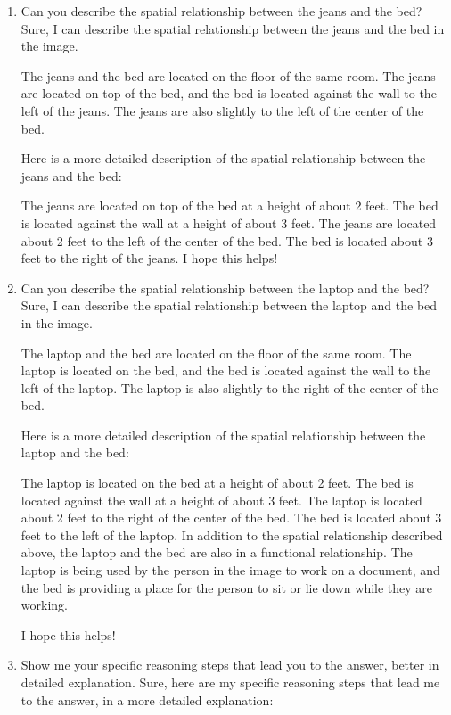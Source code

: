 \begin{enumerate}
    \item Can you describe the spatial relationship between the jeans and the bed?
    \subitem 
    Sure, I can describe the spatial relationship between the jeans and the bed in the image.
    
    The jeans and the bed are located on the floor of the same room. The jeans are located on top of the bed, and the bed is located against the wall to the left of the jeans. The jeans are also slightly to the left of the center of the bed.
    
    Here is a more detailed description of the spatial relationship between the jeans and the bed:
    
    The jeans are located on top of the bed at a height of about 2 feet.
    The bed is located against the wall at a height of about 3 feet.
    The jeans are located about 2 feet to the left of the center of the bed.
    The bed is located about 3 feet to the right of the jeans.
    I hope this helps!
    \item Can you describe the spatial relationship between the laptop and the bed?
    \subitem 
    Sure, I can describe the spatial relationship between the laptop and the bed in the image.
    
    The laptop and the bed are located on the floor of the same room. The laptop is located on the bed, and the bed is located against the wall to the left of the laptop. The laptop is also slightly to the right of the center of the bed.
    
    Here is a more detailed description of the spatial relationship between the laptop and the bed:
    
    The laptop is located on the bed at a height of about 2 feet.
    The bed is located against the wall at a height of about 3 feet.
    The laptop is located about 2 feet to the right of the center of the bed.
    The bed is located about 3 feet to the left of the laptop.
    In addition to the spatial relationship described above, the laptop and the bed are also in a functional relationship. The laptop is being used by the person in the image to work on a document, and the bed is providing a place for the person to sit or lie down while they are working.
    
    I hope this helps!
    \item Show me your specific reasoning steps that lead you to the answer, better in detailed explanation.
    \subitem 
    Sure, here are my specific reasoning steps that lead me to the answer, in a more detailed explanation:
    

\end{enumerate}
